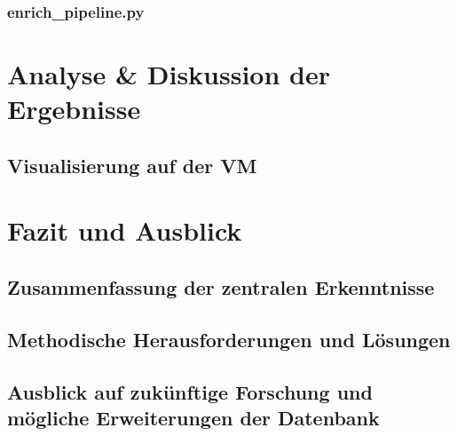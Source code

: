 \documentclass[12pt, a4paper, ngerman, bidi=default]{article}
\begin{document}
\subsubsection{enrich\_pipeline.py}


\section{Analyse \& Diskussion der Ergebnisse}
\subsection{Visualisierung auf der VM}


\section{Fazit und Ausblick}
\subsection{Zusammenfassung der zentralen Erkenntnisse}
\subsection{Methodische Herausforderungen und Lösungen}
\subsection{Ausblick auf zukünftige Forschung und mögliche Erweiterungen der Datenbank}
\newpage

\pagecolor{white}
\newpage
\begingroup
\small
\singlespacing%
\end{document}
